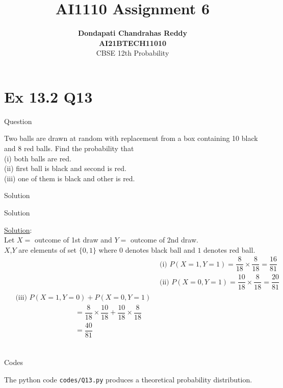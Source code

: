 \documentclass{beamer}
\title{\textbf{AI1110 Assignment 6} }
\author{\textbf{Dondapati Chandrahas Reddy}\\\textbf{AI21BTECH11010}\\ CBSE 12th Probability}
\begin{document}
	

\begin{frame}
	\titlepage 
\end{frame}


\section{Ex 13.2 Q13}
\begin{frame}{Question}

Two balls are drawn at random with replacement from a box containing 10 black
and 8 red balls. Find the probability that\\
(i) both balls are red.\\
(ii) first ball is black and second is red.\\
(iii) one of them is black and other is red.\\

\end{frame}


\begin{frame}{Solution}
	\begin{table}[h!]
		
	\end{table}
\end{frame}


\begin{frame}{Solution}
	
{\large \underline{Solution}:}\\

Let $X=$ outcome of 1st draw and $Y=$ outcome of 2nd draw.\\

$X$,$Y$ are elements of set $\{0,1\}$ where $0$ denotes black ball and $1$ denotes red ball.
\begin{align}
	&\text{(i) } P(X=1, Y=1) = \dfrac{8}{18} \times \dfrac{8}{18}  = \dfrac{16}{81}\\[1em]
	&\text{(ii) } P(X=0, Y=1) = \dfrac{10}{18} \times \dfrac{8}{18}  = \dfrac{20}{81}\\[1em]
	\begin{split}
	&\text{(iii) } P(X=1, Y=0) + P(X=0, Y=1)\\[1ex]
	& \hspace{100pt} = \dfrac{8}{18} \times \dfrac{10}{18} + \dfrac{10}{18} \times \dfrac{8}{18}\\[1ex]
	&  \hspace{100pt} = \dfrac{40}{81} 
	\end{split}
\end{align}\\

\end{frame}


\begin{frame}{Codes}
	
The python code \texttt{codes/Q13.py} produces a theoretical probability distribution.

\end{frame}
\end{document}
